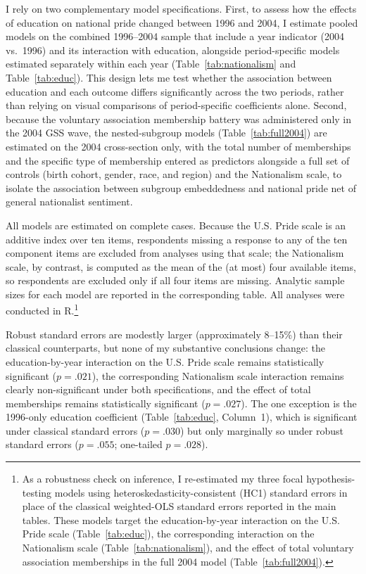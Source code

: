 \documentclass[12pt,letterpaper]{article}
\begin{document}
I rely on two complementary model specifications. First, to assess how the effects of education on national pride changed between 1996 and 2004, I estimate pooled models on the combined 1996--2004 sample that include a year indicator (2004 vs.\ 1996) and its interaction with education, alongside period-specific models estimated separately within each year (Table~\ref{tab:nationalism} and Table~\ref{tab:educ}). This design lets me test whether the association between education and each outcome differs significantly across the two periods, rather than relying on visual comparisons of period-specific coefficients alone. Second, because the voluntary association membership battery was administered only in the 2004 GSS wave, the nested-subgroup models (Table~\ref{tab:full2004}) are estimated on the 2004 cross-section only, with the total number of memberships and the specific type of membership entered as predictors alongside a full set of controls (birth cohort, gender, race, and region) and the Nationalism scale, to isolate the association between subgroup embeddedness and national pride net of general nationalist sentiment.

All models are estimated on complete cases. Because the U.S. Pride scale is an additive index over ten items, respondents missing a response to any of the ten component items are excluded from analyses using that scale; the Nationalism scale, by contrast, is computed as the mean of the (at most) four available items, so respondents are excluded only if all four items are missing. Analytic sample sizes for each model are reported in the corresponding table. All analyses were conducted in R.\footnote{As a robustness check on inference, I re-estimated my three focal hypothesis-testing models using heteroskedasticity-consistent (HC1) standard errors in place of the classical weighted-OLS standard errors reported in the main tables. These models target the education-by-year interaction on the U.S. Pride scale (Table~\ref{tab:educ}), the corresponding interaction on the Nationalism scale (Table~\ref{tab:nationalism}), and the effect of total voluntary association memberships in the full 2004 model (Table~\ref{tab:full2004}).}

Robust standard errors are modestly larger (approximately 8--15\%) than their classical counterparts, but none of my substantive conclusions change: the education-by-year interaction on the U.S. Pride scale remains statistically significant ($p = .021$), the corresponding Nationalism scale interaction remains clearly non-significant under both specifications, and the effect of total memberships remains statistically significant ($p = .027$). The one exception is the 1996-only education coefficient (Table~\ref{tab:educ}, Column~1), which is significant under classical standard errors ($p = .030$) but only marginally so under robust standard errors ($p = .055$; one-tailed $p = .028$).
\end{document}
